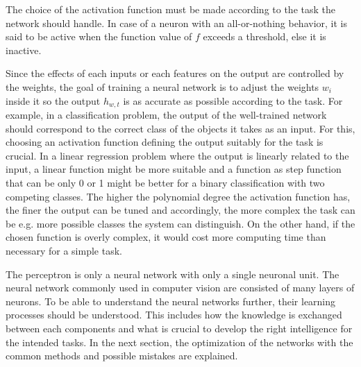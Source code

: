 The choice of the activation function must be made according to the task the network should handle. In case of a neuron with an all-or-nothing behavior, it is said to be active when the function value of $f$ exceeds a threshold, else it is inactive.

Since the effects of each inputs or each features on the output are controlled by the weights, the goal of training a neural network is to adjust the weights $w_i$ inside it so the output $h_{w, t}$ is as accurate as possible according to the task. For example, in a classification problem, the output of the well-trained network should correspond to the correct class of the objects it takes as an input. For this, choosing an activation function defining the output suitably for the task is crucial. In a linear regression problem where the output is linearly related to the input, a linear function might be more suitable and a function as step function that can be only 0 or 1 might be better for a binary classification with two competing classes. The higher the polynomial degree the activation function has, the finer the output can be tuned and accordingly, the more complex the task can be e.g. more possible classes the system can distinguish. On the other hand, if the chosen function is overly complex, it would cost more computing time than necessary for a simple task. 

The perceptron is only a neural network with only a single neuronal unit. The neural network commonly used in computer vision are consisted of many layers of neurons. To be able to understand the neural networks further, their learning processes should be understood. This includes how the knowledge is exchanged between each components and what is crucial to develop the right intelligence for the intended tasks. In the next section, the optimization of the networks with the common methods and possible mistakes are explained. 

